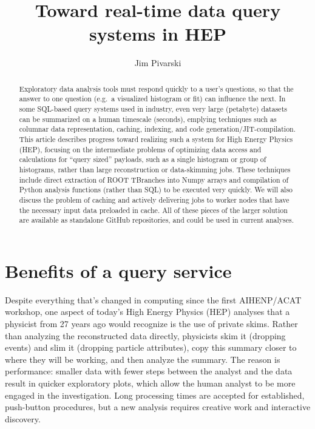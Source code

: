 \documentclass[a4paper]{jpconf}
\begin{document}
\title{Toward real-time data query systems in HEP}

\author{Jim Pivarski}

\address{147 N.\ Ridgeland Ave.\ Unit 3S, Oak Park, IL 60302, US}


\begin{abstract}
Exploratory data analysis tools must respond quickly to a user's questions, so that the answer to one question (e.g.\ a visualized histogram or fit) can influence the next. In some SQL-based query systems used in industry, even very large (petabyte) datasets can be summarized on a human timescale (seconds), emplying techniques such as columnar data representation, caching, indexing, and code generation/JIT-compilation. This article describes progress toward realizing such a system for High Energy Physics (HEP), focusing on the intermediate problems of optimizing data access and calculations for ``query sized'' payloads, such as a single histogram or group of histograms, rather than large reconstruction or data-skimming jobs. These techniques include direct extraction of ROOT TBranches into Numpy arrays and compilation of Python analysis functions (rather than SQL) to be executed very quickly. We will also discuss the problem of caching and actively delivering jobs to worker nodes that have the necessary input data preloaded in cache. All of these pieces of the larger solution are available as standalone GitHub repositories, and could be used in current analyses.
\end{abstract}

\section{Benefits of a query service}

Despite everything that's changed in computing since the first AIHENP/ACAT workshop, one aspect of today's High Energy Physics (HEP) analyses that a physicist from 27 years ago would recognize is the use of private skims. Rather than analyzing the reconstructed data directly, physicists skim it (dropping events) and slim it (dropping particle attributes), copy this summary closer to where they will be working, and then analyze the summary. The reason is performance: smaller data with fewer steps between the analyst and the data result in quicker exploratory plots, which allow the human analyst to be more engaged in the investigation. Long processing times are accepted for established, push-button procedures, but a new analysis requires creative work and interactive discovery.
\end{document}
